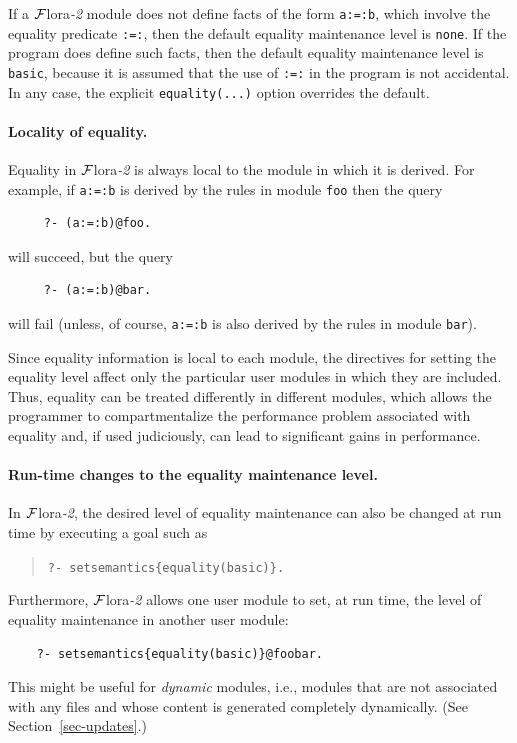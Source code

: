\documentclass[11pt]{article}
\newcommand{\FLSYSTEM}{{\mbox{\sc ${\cal F}${lora}\rm\emph{-2}}}\xspace}
\begin{document}
If a \FLSYSTEM module does not define facts of the form {\tt a:=:b}, which
involve the equality predicate {\tt :=:}, then the default equality
maintenance level is {\tt none}. If the program does define such facts,
then the default equality maintenance level is {\tt basic}, because it is
assumed that the use of {\tt :=:} in the program is not accidental.
In any case, the explicit {\tt equality(...)} option overrides the default.

\paragraph{Locality of equality.}
Equality in \FLSYSTEM is always local to the module in which it is derived.
For example, if {\tt a:=:b} is derived by the rules in module {\tt foo}
then the query
\begin{verbatim}
     ?- (a:=:b)@foo.  
\end{verbatim}
will succeed, but the query
\begin{verbatim}
     ?- (a:=:b)@bar.  
\end{verbatim}
will fail (unless, of course, {\tt a:=:b} is also derived by the rules in
module {\tt bar}).

Since equality information is local to each module, the directives for
setting the equality level affect only the particular user modules in which
they are included.  Thus, equality can be treated differently in different
modules, which allows the programmer to compartmentalize the performance
problem associated with equality and, if used judiciously, can lead to
significant gains in performance.

\paragraph{Run-time changes to the equality maintenance level.}
In \FLSYSTEM, the desired level of equality maintenance can also be changed at
run time by executing a goal such as
\begin{quote}
 {\tt ?- setsemantics\{equality(basic)\}.}
\end{quote}
Furthermore, \FLSYSTEM allows one user module to set, at run time, the level
of equality maintenance in another user module:
\begin{verbatim}
    ?- setsemantics{equality(basic)}@foobar.
\end{verbatim}
This might be useful for \emph{dynamic} modules, i.e., modules that
are not associated with any files and whose content is generated completely
dynamically. (See Section~\ref{sec-updates}.)
\end{document}
